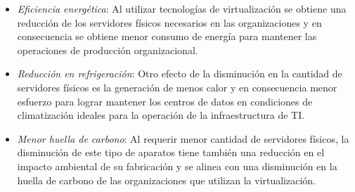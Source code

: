 \begin{itemize}
\begin{itemize}
		\item \textit{Eficiencia energética}: Al utilizar tecnologías de virtualización se obtiene una reducción de los servidores físicos necesarios en las organizaciones y en consecuencia se obtiene menor consumo de energía para mantener las operaciones de producción organizacional. \\
		
		\item \textit{Reducción en refrigeración}: Otro efecto de la disminución en la cantidad de servidores físicos es la generación de menos calor y en consecuencia menor esfuerzo para lograr mantener los centros de datos en condiciones de climatización ideales para la operación de la infraestructura de TI.\\
		
		\item \textit{Menor huella de carbono}: Al requerir menor cantidad de servidores físicos, la disminución de este tipo de aparatos tiene también una reducción en el impacto ambiental de su fabricación y se alinea con una disminución en la huella de carbono de las organizaciones que utilizan la virtualización.\\
	\end{itemize}
\end{itemize}

